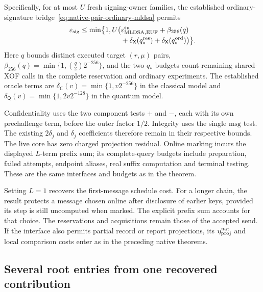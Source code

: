 \documentclass[pdflatex]{sn-jnl}
\theoremstyle{thmstyleone}
\theoremstyle{thmstylethree}
\theoremstyle{thmstyletwo}
\begin{document}
Specifically, for at most $U$ fresh signing-owner families, the established
ordinary-signature bridge~\eqref{eq:native-pair-ordinary-mldsa} permits
\[
\begin{split}
 \varepsilon_{\rm sig}\le\min\bigl\{1,U\bigl(&
 \varepsilon_{\rm MLDSA,EUF}^{\rm su}+\beta_{256}(q)\\[-2pt]
 &+\delta_{\mathsf X}(q_*^{\rm res})
  +\delta_{\mathsf X}(q_*^{\rm ord})\bigr)\bigr\}.
\end{split}
\]
Here $q$ bounds distinct executed target $(r,\mu)$ pairs,
$\beta_{256}(q)=\min\{1,\binom q2 2^{-256}\}$, and the two $q_*$ budgets
count remaining shared-XOF calls in the complete reservation and ordinary
experiments. The established oracle terms are
$\delta_{\mathsf C}(v)=\min\{1,v2^{-256}\}$ in the classical model and
$\delta_{\mathsf Q}(v)=\min\{1,2v2^{-128}\}$ in the quantum model.

Confidentiality uses the two component tests $+$ and $-$, each with its
own prechallenge term, before the outer factor $1/2$. Integrity uses the
single $\mathrm{msg}$ test. The existing $2\delta_j$ and $\delta_j$
coefficients therefore remain in their respective bounds. The live core
has zero charged projection residual. Online marking incurs the displayed
$L$-term prefix sum; its complete-query budgets include preparation,
failed attempts, endpoint aliases, real suffix computation and terminal
testing. These are the same interfaces and budgets as in the theorem.

Setting $L=1$ recovers the first-message schedule cost. For a longer
chain, the result protects a message chosen online after disclosure of
earlier keys, provided its step is still uncomputed when marked. The
explicit prefix sum accounts for that choice. The reservations and
acquisitions remain those of the accepted send.
If the interface also permits partial record or report projections,
its $\eta_{\rm proj}^{\rm nat}$ and local comparison costs enter as
in the preceding native theorems.

\subsection{Several root entries from one recovered contribution}
\label{sec:multiple-root-entry}
\end{document}
